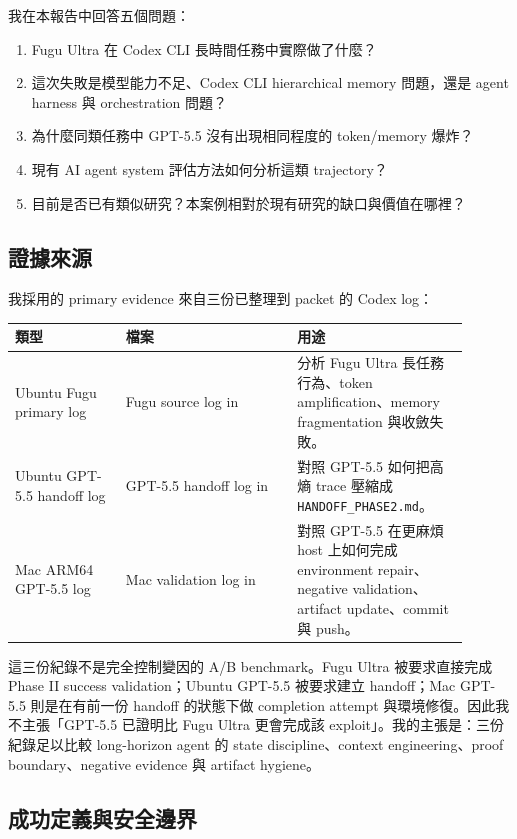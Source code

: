 \documentclass[UTF8,a4paper,11pt]{ctexart}
\newcommand{\artifact}[1]{\texttt{#1}}
\begin{document}
我在本報告中回答五個問題：

\begin{enumerate}
  \item Fugu Ultra 在 Codex CLI 長時間任務中實際做了什麼？
  \item 這次失敗是模型能力不足、Codex CLI hierarchical memory 問題，還是 agent harness 與 orchestration 問題？
  \item 為什麼同類任務中 GPT-5.5 沒有出現相同程度的 token/memory 爆炸？
  \item 現有 AI agent system 評估方法如何分析這類 trajectory？
  \item 目前是否已有類似研究？本案例相對於現有研究的缺口與價值在哪裡？
\end{enumerate}

\subsection{證據來源}

我採用的 primary evidence 來自三份已整理到 packet 的 Codex log：

\begin{longtable}{L{0.22\linewidth} L{0.34\linewidth} L{0.34\linewidth}}
\toprule
類型 & 檔案 & 用途\\
\midrule
Ubuntu Fugu primary log & Fugu source log in  & 分析 Fugu Ultra 長任務行為、token amplification、memory fragmentation 與收斂失敗。\\
Ubuntu GPT-5.5 handoff log & GPT-5.5 handoff log in  & 對照 GPT-5.5 如何把高熵 trace 壓縮成 \artifact{HANDOFF\_PHASE2.md}。\\
Mac ARM64 GPT-5.5 log & Mac validation log in  & 對照 GPT-5.5 在更麻煩 host 上如何完成 environment repair、negative validation、artifact update、commit 與 push。\\
\bottomrule
\end{longtable}

這三份紀錄不是完全控制變因的 A/B benchmark。Fugu Ultra 被要求直接完成 Phase II success validation；Ubuntu GPT-5.5 被要求建立 handoff；Mac GPT-5.5 則是在有前一份 handoff 的狀態下做 completion attempt 與環境修復。因此我不主張「GPT-5.5 已證明比 Fugu Ultra 更會完成該 exploit」。我的主張是：三份紀錄足以比較 long-horizon agent 的 state discipline、context engineering、proof boundary、negative evidence 與 artifact hygiene。

\subsection{成功定義與安全邊界}
\end{document}
